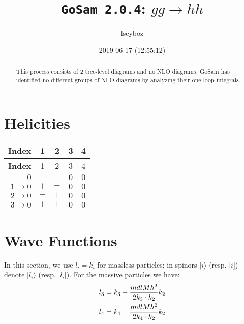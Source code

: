 \documentclass[a4paper]{article}
\title{\texttt{GoSam 2.0.4}: ${g}{g}\rightarrow{h}{h}$}
\author{lscyboz}
\date{2019-06-17 (12:55:12)}
\newcommand{\kea}[1]{\vert #1 \rangle}
\newcommand{\keb}[1]{\vert #1 ]}
\begin{document}
\maketitle
\begin{abstract}
\noindent This process consists of 2 tree-level diagrams and no NLO diagrams. GoSam has identified no different groups of NLO diagrams by analyzing their one-loop integrals.
\end{abstract}
\newpage
\tableofcontents
\newpage

\section{Helicities}

\begin{longtable}[c]{r|cccc}
\bf{Index} &1&2&3&4\\
\hline
\endfirsthead
\bf{Index} &1&2&3&4\\
\hline
\endhead 
$0$& $-$& $-$& $0$& $0$\\
$1\rightarrow 0$& $+$& $-$& $0$& $0$\\
$2\rightarrow 0$& $-$& $+$& $0$& $0$\\
$3\rightarrow 0$& $+$& $+$& $0$& $0$\\
\end{longtable}
\section{Wave Functions}
In this section, we use $l_i=k_i$ for massless particles;
in spinors $\kea{i}$ (resp. $\keb{i}$) denote $\kea{l_i}$ (resp. $\keb{l_i}$).
For the massive particles we have:
\begin{align}
l_{3} &= k_{3} - \frac{mdlMh^2}{%
      2 k_{3}\cdot k_{2}}k_{2}\\
l_{4} &= k_{4} - \frac{mdlMh^2}{%
      2 k_{4}\cdot k_{2}}k_{2}
\end{align}
\end{document}

